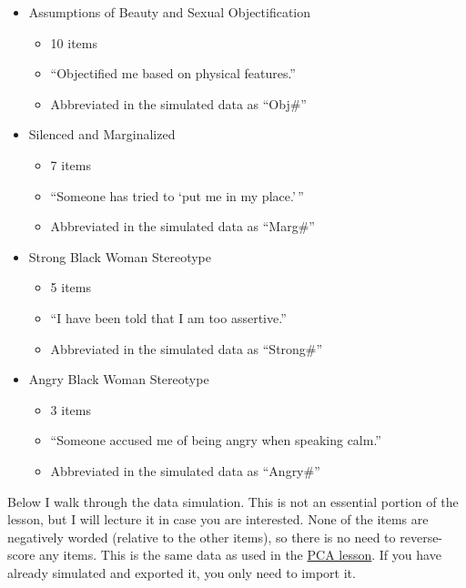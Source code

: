 \documentclass[
  english,
]{book}
\providecommand{\tightlist}{%
  \setlength{\itemsep}{0pt}\setlength{\parskip}{0pt}}
\begin{document}
\begin{itemize}
\tightlist
\item
  Assumptions of Beauty and Sexual Objectification

  \begin{itemize}
  \tightlist
  \item
    10 items
  \item
    ``Objectified me based on physical features.''
  \item
    Abbreviated in the simulated data as ``Obj\#''
  \end{itemize}
\item
  Silenced and Marginalized

  \begin{itemize}
  \tightlist
  \item
    7 items
  \item
    ``Someone has tried to `put me in my place.'\,''
  \item
    Abbreviated in the simulated data as ``Marg\#''
  \end{itemize}
\item
  Strong Black Woman Stereotype

  \begin{itemize}
  \tightlist
  \item
    5 items
  \item
    ``I have been told that I am too assertive.''
  \item
    Abbreviated in the simulated data as ``Strong\#''
  \end{itemize}
\item
  Angry Black Woman Stereotype

  \begin{itemize}
  \tightlist
  \item
    3 items
  \item
    ``Someone accused me of being angry when speaking calm.''
  \item
    Abbreviated in the simulated data as ``Angry\#''
  \end{itemize}
\end{itemize}

Below I walk through the data simulation. This is not an essential portion of the lesson, but I will lecture it in case you are interested. None of the items are negatively worded (relative to the other items), so there is no need to reverse-score any items. This is the same data as used in the \protect\hyperlink{PCA}{PCA lesson}. If you have already simulated and exported it, you only need to import it.
\end{document}
